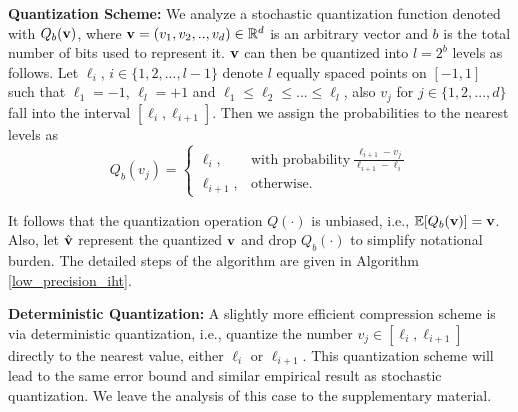 \documentclass{article}
\begin{document}
{\bf Quantization Scheme:} We analyze a stochastic quantization function denoted with $Q_b({\bf v})$, where ${\bf v}=(v_1, v_2, .., v_d) \in \mathbb{R}^d$ is an arbitrary vector and $b$ is the total number of bits used to represent it. ${\bf v}$ can then be quantized into $l=2^b$ levels as follows. Let $\ell_i$, $i\in \{1, 2, ..., l-1 \}$ denote $l$ equally spaced points on $[-1, 1]$ such that $\ell_1= -1$, $\ell_l= +1$ and $\ell_1\leq\ell_2 \leq ... \leq \ell_l$, also $v_j$ for $j\in \{1, 2, ..., d \}$ fall into the interval $[\ell_i, \ell_{i+1}]$. Then we assign the probabilities to the nearest levels as
\[
    Q_b(v_j) = \left\{\begin{array}{lr}
        \ell_i, & \textrm{with probability} \ \frac{\ell_{i+1}-v_j}{\ell_{i+1}-\ell_i}\\
        \ell_{i+1},&\textrm{otherwise}.  \ \ \ \  \ \ \ \ \ \ \ \ \ \ \ \ \ \ 
        \end{array}
\]
  
It follows that the quantization operation $Q(\cdot)$ is unbiased, i.e., $\mathbb{E}[Q_b({\bf v})] = {\bf v}$. Also, let $\hat{{\bf v}}$ represent the quantized ${\bf v}$ and drop $Q_b(\cdot)$ to simplify notational burden. The detailed steps of the algorithm are given in Algorithm \ref{low_precision_iht}.

{\bf Deterministic Quantization:} A slightly more efficient compression scheme is via deterministic quantization, i.e., quantize the number
$v_j \in [\ell_i, \ell_{i+1}]$ directly to the nearest
value, either $\ell_i$ or $\ell_{i+1}$. 
This quantization scheme will lead to the same 
error bound and similar empirical result as stochastic quantization. {We leave the analysis
of this case to the supplementary material.}
\end{document}

